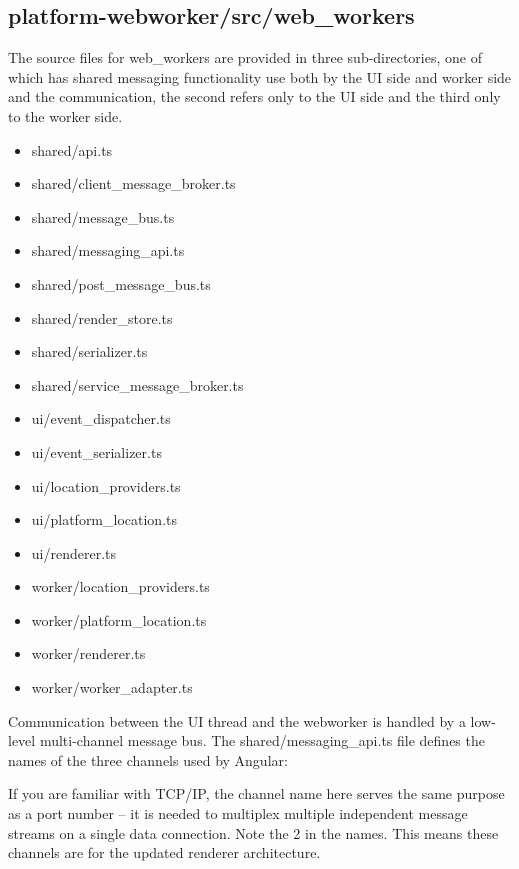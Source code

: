 \subsection{platform-webworker/src/web\_workers}

The source files for web\_workers are provided in three sub-directories, one of which
has shared messaging functionality use both by the UI side and worker side and the
communication, the second refers only to the UI side and the third only to the worker
side.

\begin{itemize}
  \item shared/api.ts
  \item shared/client\_message\_broker.ts
  \item shared/message\_bus.ts
  \item shared/messaging\_api.ts
  \item shared/post\_message\_bus.ts
  \item shared/render\_store.ts
  \item shared/serializer.ts
  \item shared/service\_message\_broker.ts
  \item ui/event\_dispatcher.ts
  \item ui/event\_serializer.ts
  \item ui/location\_providers.ts
  \item ui/platform\_location.ts
  \item ui/renderer.ts
  \item worker/location\_providers.ts
  \item worker/platform\_location.ts
  \item worker/renderer.ts
  \item worker/worker\_adapter.ts
\end{itemize}

Communication between the UI thread and the webworker is handled by a low-level
multi-channel message bus. The shared/messaging\_api.ts file defines the names of
the three channels used by Angular:



If you are familiar with TCP/IP, the channel name here serves the same purpose as a
port number – it is needed to multiplex multiple independent message streams on a
single data connection. Note the 2 in the names. This means these channels are for
the updated renderer architecture.

